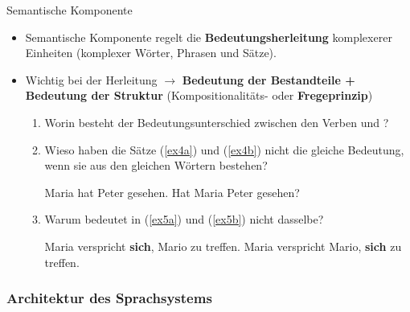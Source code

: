 \begin{frame}{Semantische Komponente}
	
	\begin{itemize}
		\item Semantische Komponente regelt die \textbf{Bedeutungsherleitung} komplexerer Einheiten (komplexer Wörter, Phrasen und Sätze).
		\item<2-> Wichtig bei der Herleitung $\rightarrow$ \textbf{Bedeutung der Bestandteile + Bedeutung der Struktur} (Kompositionalitäts- oder \textbf{Fregeprinzip})
				
		\begin{enumerate}
			\item<3->[$\rightarrow$] Worin besteht der Bedeutungsunterschied zwischen den Verben  und ?
			\item<4->[$\rightarrow$] Wieso haben die Sätze (\ref{ex4a}) und (\ref{ex4b})
                          nicht die gleiche Bedeutung,\\
wenn sie aus den gleichen Wörtern bestehen?

\eal	
	\ex Maria hat Peter gesehen. \label{ex4a}
	\ex Hat Maria Peter gesehen? \label{ex4b}
\zl

			\item<5->[$\rightarrow$] Warum bedeutet  in (\ref{ex5a}) und (\ref{ex5b}) nicht dasselbe?
	
\eal
	\ex Maria verspricht \textbf{sich}, Mario zu treffen. \label{ex5a}
	\ex Maria verspricht Mario, \textbf{sich} zu treffen. \label{ex5b}
\zl
		\end{enumerate}
	\end{itemize}
	
\end{frame}


\subsubsection{Architektur des Sprachsystems}
		
